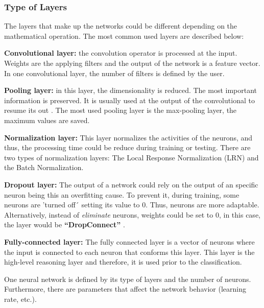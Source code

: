 \subsubsection{Type of Layers}
The layers that make up the networks could be different depending on the mathematical operation. The most common used layers are described below:
\begin{description}[itemsep=2pt,topsep=8pt,parsep=0pt,partopsep=20pt]
	\item \textbf{Convolutional layer:} the convolution operator is processed at the input. Weights are the applying filters and the output of the network is a feature vector. In one convolutional layer, the number of filters is defined by the user.
	\item \textbf{Pooling layer:} in this layer, the dimensionality is reduced. The most important information is preserved. It is usually used at the output of the convolutional to resume its out \cite{Doorn}. The most used pooling layer is the max-pooling layer, the maximum values are saved.
	\item \textbf{Normalization layer:} This layer normalizes the activities of the neurons, and thus, the processing time could be reduce during training or testing. There are two types of normalization layers: The Local Response Normalization (LRN) and the Batch Normalization.
	\item \textbf{Dropout layer:} The output of a network could rely on the output of an specific neuron being this an overfitting cause. To prevent it, during training, some neurons are 'turned off´ setting its value to 0. Thus, neurons are more adaptable. Alternatively, instead of \textit{eliminate} neurons,  weights could be set to 0, in this case, the layer would be \textbf{``DropConnect''} \cite{Doorn}.
\item  \textbf{Fully-connected layer:} The fully connected layer is a vector of neurons where the input is connected to each neuron that conforms this layer. This layer is the high-level reasoning layer and therefore, it is used prior to the classification.
\end{description}

One neural network is defined by its type of layers and the number of neurons. Furthermore, there are parameters that affect the network behavior (learning rate, etc.)\cite{Lecum2}.\\

